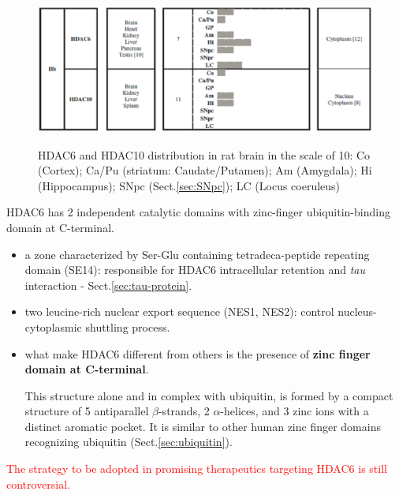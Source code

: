 \begin{figure}[hbt]
  \centerline{\includegraphics[height=5cm,
    angle=0]{./images/HDAC_ClassIIB-subcellular-rat-brain.eps}}
\caption{HDAC6 and HDAC10 distribution in rat brain in the scale of 10:
Co (Cortex); Ca/Pu (striatum: Caudate/Putamen); Am (Amygdala); Hi
(Hippocampus); SNpc (Sect.\ref{sec:SNpc}); LC (Locus coeruleus)}
\label{fig:HDAC_ClassIIB-subcellular-rat-brain}
\end{figure}


HDAC6 has 2 independent catalytic domains with zinc-finger ubiquitin-binding
domain at C-terminal.
\begin{itemize}
  \item a zone characterized by Ser-Glu containing tetradeca-peptide repeating
  domain (SE14): responsible for HDAC6 intracellular retention and {\it tau}
  interaction - Sect.\ref{sec:tau-protein}.
  
  \item two leucine-rich nuclear export sequence (NES1, NES2):
  control nucleus-cytoplasmic shuttling process.
  
  \item what make HDAC6 different from others is the presence of {\bf zinc
  finger domain at C-terminal}.
  
This structure  alone and in complex with ubiquitin, is formed by a compact
structure of 5 antiparallel $\beta$-strands, 2 $\alpha$-helices, and 3 zinc ions
with a distinct aromatic pocket. It is similar to other human zinc finger
domains recognizing ubiquitin (Sect.\ref{sec:ubiquitin}).

\end{itemize}

\textcolor{red}{The strategy to be adopted in promising therapeutics targeting
HDAC6 is still controversial.}

